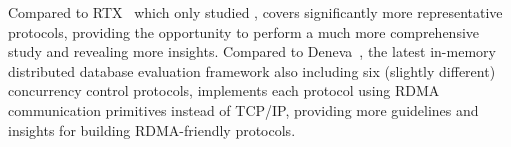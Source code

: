 Compared to RTX~\cite{wei2018deconstructing} which only studied \occ, \projectname covers
significantly more representative protocols,
providing the opportunity to perform
a much more comprehensive study and revealing 
more insights. 
Compared to Deneva~\cite{harding2017evaluation}, the latest in-memory distributed database evaluation framework also including six 
(slightly different) concurrency control protocols, \projectname
implements each protocol using
RDMA communication primitives 
instead of TCP/IP, providing more guidelines and insights for building RDMA-friendly protocols.


\begin{comment}
\begin{itemize}
    \item For workloads with more computation (CPU bound), one-sided is better since it bypasses the remote CPU. Its advantage grows with increasing computation workloads.
    \item 
   More advanced protocols reduce abort rate while launching more RDMA one-sided operations. 
   For RPC, they are better in all condition because the protocols will only increase the number of local operations while reducing the abort rate.
    \item For workloads with less computation and low contention, one-sided \occ is the best
    due to its simple and low number
    of network operations.
    For workloads with higher contention, protocols like one-sided \mvcc and \sundial are better choices because they have optimization to reduce read-write conflict.
    \item For workloads bounded by network with low contention, increasing the number of
    co-routines leads to higher throughput.
    \item Even if ConnectX-3 has poor support for RDMA one-sided operations, increasing the number of co-routines is still beneficial 
    when transactions have more computation.
\end{itemize}
\end{comment}





